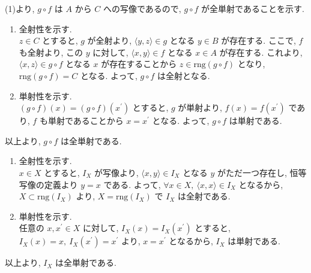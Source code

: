 \begin{nmprob}
{(1)より, $g\circ f$ は $A$ から $C$ への写像であるので, $g\circ f$ が全単射であることを示す.
\begin{enumerate}
\item 全射性を示す.\\
$z \in C$ とすると, $g$ が全射より, $\langle y, z\rangle \in g$ となる $y \in B$ が存在する. ここで, $f$ も全射より, この $y$ に対して, $\langle x, y\rangle \in f$ となる $x \in A$ が存在する.
これより, $\langle x, z\rangle \in g \circ f$ となる $x$ が存在することから $z \in \text{rng}(g \circ f)$ となり, $\text{rng}(g \circ f) = C$ となる. よって, $g\circ f$ は全射となる.
\item 単射性を示す.\\
$(g\circ f)(x) = (g\circ f)(x^{'})$ とすると, $g$ が単射より, $f(x) = f(x^{'})$ であり, $f$ も単射であることから $x = x^{'}$ となる. よって, $g\circ f$ は単射である.
\end{enumerate}
以上より, $g\circ f$ は全単射である.
\item
\begin{enumerate}
\item 全射性を示す.\\
$x \in X$ とすると, $I_X$ が写像より, $\langle x, y\rangle \in I_X$ となる $y$ がただ一つ存在し, 恒等写像の定義より $y = x$ である.
よって, $\forall x \in X,\ \langle x, x\rangle \in I_X$ となるから, $X \subset \text{rng}(I_X)$ より, $X = \text{rng}(I_X)$ で $I_X$ は全射である.
\item 単射性を示す.\\
任意の $x, x^{'} \in X$ に対して, $I_X(x) = I_X(x^{'})$ とすると, $I_X(x) = x,\ I_X(x^{'}) = x^{'}$ より, $x = x^{'}$ となるから, $I_X$ は単射である.
\end{enumerate}
以上より, $I_X$ は全単射である.
}
\end{nmprob}




